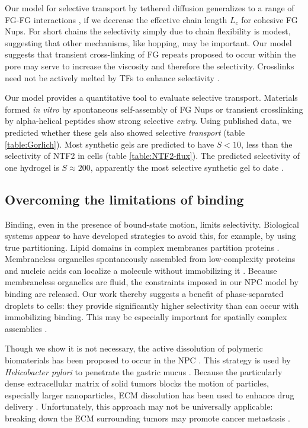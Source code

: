Our model for selective transport by tethered diffusion generalizes to
a range of FG-FG interactions \cite{vovk16}, if we decrease the
effective chain length $L_c$ for cohesive FG Nups.  For short chains
the selectivity simply due to chain flexibility is modest, suggesting
that other mechanisms, like hopping, may be important.  Our model
suggests that transient cross-linking of FG repeats proposed to occur
within the pore may serve to increase the viscosity and therefore the
selectivity. Crosslinks need not be actively melted by TFs to enhance
selectivity .
  
Our model provides a quantitative tool to evaluate selective
transport. Materials formed \textit{in vitro} by spontaneous
self-assembly of FG Nups \cite{frey07} or transient crosslinking by
alpha-helical peptides \cite{kim15} show strong selective
\textit{entry}.  Using published data, we predicted whether these gels
also showed selective \textit{transport} (table \ref{table:Gorlich}).
Most synthetic gels are predicted to have $S<10$, less than the
selectivity of NTF2 in cells (table \ref{table:NTF2-flux}). The
predicted selectivity of one hydrogel is $S\approx200$, apparently the
most selective synthetic gel to date \cite{frey07}.


\subsection{Overcoming the limitations of binding}
Binding, even in the presence of bound-state motion, limits
selectivity.  Biological systems appear to have developed strategies
to avoid this, for example, by using true partitioning.  Lipid domains
in complex membranes partition proteins \cite{simons11}.  Membraneless
organelles spontaneously assembled from low-complexity proteins and
nucleic acids can localize a molecule without immobilizing it
\cite{brangwynne15}.  Because membraneless organelles are fluid, the
constraints imposed in our NPC model by binding are released.  Our
work thereby suggests a benefit of phase-separated droplets to cells:
they provide significantly higher selectivity than can occur with
immobilizing binding. This may be especially important for spatially
complex assemblies \cite{feric16}.

Though we show it is not necessary, the active dissolution of
polymeric biomaterials has been proposed to occur in the NPC
\cite{ribbeck01}. This strategy is used by \textit{Helicobacter
  pylori} to penetrate the gastric mucus \cite{celli09}. Because the
particularly dense extracellular matrix of solid tumors blocks the
motion of particles, especially larger nanoparticles, ECM dissolution
has been used to enhance drug delivery \cite{zhou13}. Unfortunately,
this approach may not be universally applicable: breaking down the ECM
surrounding tumors may promote cancer metastasis \cite{miao15}.


